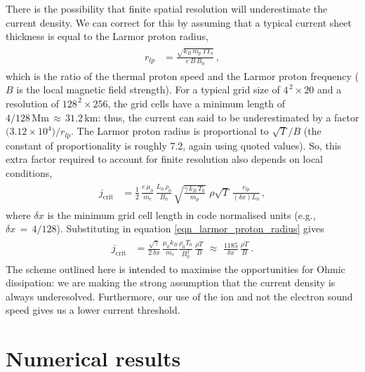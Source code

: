 \documentclass{./packages/rs/rsproca}
\begin{document}
There is the possibility that finite spatial resolution will underestimate the current density. We can correct for this by assuming that a typical current sheet thickness is equal to the Larmor proton radius, 
\begin{align}\begin{split}  
\label{eqn_larmor_proton_radius}
r_{lp} &= \frac{\sqrt{k_B\, m_p\, T T_o}}{e\,B\,B_0}\,,
\end{split}\end{align}
which is the ratio of the thermal proton speed and the Larmor proton frequency ($B$ is the local magnetic field strength). For a typical grid size of $4^{\,2} \times 20$ and a resolution of $128^{\,2} \times 256$, the grid cells have a minimum length of $4/128\,\mathrm{Mm}\,{\approx}\,31.2\,\mathrm{km}$: thus, the current can said to be underestimated by a factor $\big(3.12\times10^4\big)/r_{lp}$. The Larmor proton radius is proportional to $\sqrt{T}/B$ (the constant of proportionality is roughly 7.2, again using quoted values). So, this extra factor required to account for finite resolution also depends on local conditions,
\begin{align}\begin{split}  
\label{eqn_critical_current4}
j_{\mathrm{crit}} &= \frac{1}{2}\,\frac{e\,\mu_0}{m_e}\,\frac{L_0\,\rho_0}{B_0}\,\sqrt{\frac{\gamma\,k_B\,T_0}{m_p}}\,\,\rho\sqrt{T}\,\frac{r_{lp}}{(\delta x) L_0}\,,
\end{split}\end{align}
where $\delta x$ is the minimum grid cell length in code normalised units (e.g., $\delta x\,{=}\,4/128$). Substituting in equation \ref{eqn_larmor_proton_radius} gives
\begin{align}\begin{split}  
\label{eqn_critical_current5}
j_{\mathrm{crit}} &= \frac{\sqrt{\gamma}}{2\,\delta x}\,\frac{\mu_0 k_B}{m_e}\frac{\rho_0 T_0}{B_0^2}\,\frac{\rho T}{B}\,\,\approx\,\,\frac{1185}{\delta x}\,\frac{\rho T}{B}\,.
\end{split}\end{align}
The scheme outlined here is intended to maximise the opportunities for Ohmic dissipation: we are making the strong assumption that the current density is always underesolved. Furthermore, our use of the ion and not the electron sound speed gives us a lower current threshold.


\section{Numerical results}
\label{sec_NumericalResults}
\end{document}
